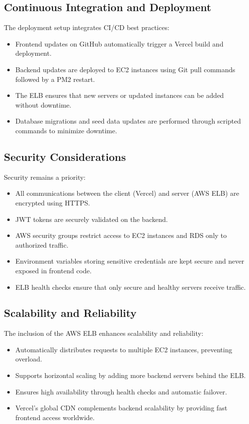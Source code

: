 \documentclass[12pt,a4paper]{article}
\begin{document}
\subsection{Continuous Integration and Deployment}

The deployment setup integrates CI/CD best practices:

\begin{itemize}
    \item Frontend updates on GitHub automatically trigger a Vercel build and deployment.
    \item Backend updates are deployed to EC2 instances using Git pull commands followed by a PM2 restart.
    \item The ELB ensures that new servers or updated instances can be added without downtime.
    \item Database migrations and seed data updates are performed through scripted commands to minimize downtime.
\end{itemize}

\subsection{Security Considerations}

Security remains a priority:

\begin{itemize}
    \item All communications between the client (Vercel) and server (AWS ELB) are encrypted using HTTPS.
    \item JWT tokens are securely validated on the backend.
    \item AWS security groups restrict access to EC2 instances and RDS only to authorized traffic.
    \item Environment variables storing sensitive credentials are kept secure and never exposed in frontend code.
    \item ELB health checks ensure that only secure and healthy servers receive traffic.
\end{itemize}

\subsection{Scalability and Reliability}

The inclusion of the AWS ELB enhances scalability and reliability:

\begin{itemize}
    \item Automatically distributes requests to multiple EC2 instances, preventing overload.
    \item Supports horizontal scaling by adding more backend servers behind the ELB.
    \item Ensures high availability through health checks and automatic failover.
    \item Vercel’s global CDN complements backend scalability by providing fast frontend access worldwide.
\end{itemize}
\end{document}
